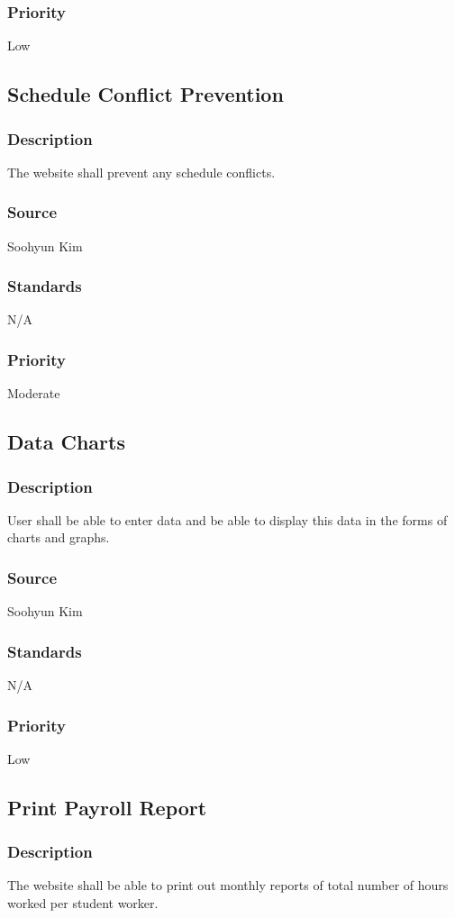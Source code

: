 \subsubsection{Priority}
Low

\subsection{Schedule Conflict Prevention}
\subsubsection{Description}
The website shall prevent any schedule conflicts.
\subsubsection{Source}
Soohyun Kim
\subsubsection{Standards}
N/A
\subsubsection{Priority}
Moderate

\subsection{Data Charts}
\subsubsection{Description}
User shall be able to enter data and be able to display this data in the forms of charts and graphs.
\subsubsection{Source}
Soohyun Kim
\subsubsection{Standards}
N/A
\subsubsection{Priority}
Low

\subsection{Print Payroll Report}
\subsubsection{Description}
The website shall be able to print out monthly reports of total number of hours worked per student worker.
